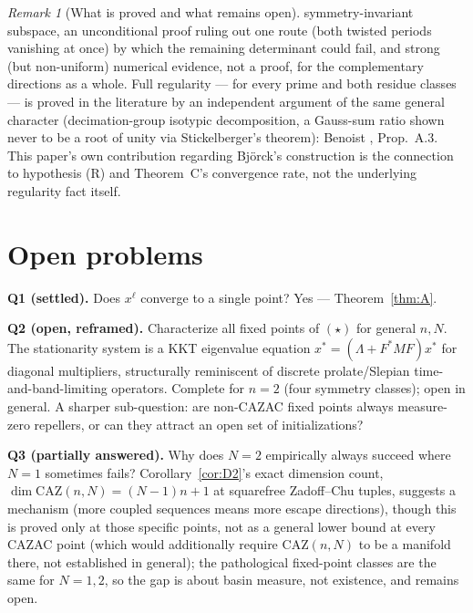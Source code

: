 \documentclass[11pt]{article}
\theoremstyle{plain}
\theoremstyle{definition}
\theoremstyle{remark}
\newtheorem{remark}[theorem]{Remark}
\newcommand{\CAZ}{\mathrm{CAZ}}
\begin{document}
\begin{remark}[What is proved and what remains open]
symmetry-invariant subspace, an unconditional proof ruling out one route
(both twisted periods vanishing at once) by which the remaining
determinant could fail, and strong (but non-uniform) numerical evidence,
not a proof, for the complementary directions as a whole. Full regularity
--- for every prime and both residue classes --- is proved in the
literature by an independent argument of the same general character
(decimation-group isotypic decomposition, a Gauss-sum ratio shown never
to be a root of unity via Stickelberger's theorem): Benoist
\cite{Benoist24}, Prop.~A.3. This paper's own contribution regarding
Bj\"orck's construction is the connection to hypothesis (R) and
Theorem~C's convergence rate, not the underlying regularity fact itself.
\end{remark}

\section{Open problems}\label{sec:open}

\noindent\textbf{Q1 (settled).} Does $x^\ell$ converge to a single point? Yes ---
Theorem~\ref{thm:A}.

\noindent\textbf{Q2 (open, reframed).} Characterize all fixed points of $(\star)$
for general $n,N$. The stationarity system is a KKT eigenvalue equation
$x^*=(\Lambda+F^*MF)x^*$ for diagonal multipliers, structurally reminiscent
of discrete prolate/Slepian time-and-band-limiting operators. Complete for
$n=2$ (four symmetry classes); open in general. A sharper sub-question:
are non-CAZAC fixed points always measure-zero repellers, or can they
attract an open set of initializations?

\noindent\textbf{Q3 (partially answered).} Why does $N=2$ empirically always
succeed where $N=1$ sometimes fails? Corollary~\ref{cor:D2}'s exact
dimension count, $\dim\CAZ(n,N)=(N-1)n+1$ at squarefree Zadoff--Chu
tuples, suggests a mechanism (more coupled sequences means more escape
directions), though this is proved only at those specific points, not as
a general lower bound at every CAZAC point (which would additionally
require $\CAZ(n,N)$ to be a manifold there, not established in general);
the pathological fixed-point classes are the same for $N=1,2$, so the gap
is about basin measure, not existence, and remains open.
\end{document}
